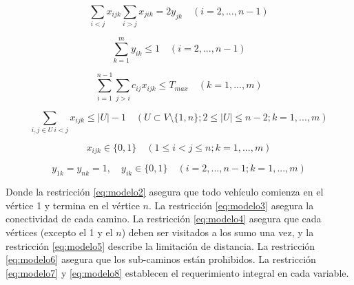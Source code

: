 \begin{equation} \label{eq:modelo3}
\sum_{i<j} x_{ijk} \sum_{i>j} x_{jik} = 2y_{jk} \quad (i =2,...,n-1)
\end{equation}

\begin{equation} \label{eq:modelo4}
\sum_{k=1}^{m} y_{ik} \leq 1 \quad (i =2,...,n-1)
\end{equation}

\begin{equation} \label{eq:modelo5}
\sum_{i=1}^{n-1} \sum_{j>i} c_{ij}x_{ijk} \leq T_{max} \quad (k=1,...,m)
\end{equation}

\begin{equation} \label{eq:modelo6}
\sum_{i,j\in U \ i<j} x_{ijk} \leq |U|-1 \quad (U \subset V \setminus \{1,n\} ; 2 \leq |U| \leq n-2; k=1,...,m)
\end{equation}

\begin{equation} \label{eq:modelo7}
x_{ijk} \in \{0,1\} \quad (1 \leq i < j \leq n; k=1,...,m)
\end{equation}

\begin{equation} \label{eq:modelo8}
y_{1k} = y_{nk} = 1, \quad y_{ik} \in \{0,1\} \quad (i = 2,...,n-1; k=1,...,m)
\end{equation}

Donde la restricción \ref{eq:modelo2} asegura que todo vehículo comienza en el vértice 1 y termina en el vértice $n$. La restricción \ref{eq:modelo3} asegura la conectividad de cada camino. La restricción \ref{eq:modelo4} asegura que cada vértices (excepto el 1 y el $n$) deben ser visitados a los sumo una vez, y la restricción \ref{eq:modelo5} describe la limitación de distancia. La restricción \ref{eq:modelo6} asegura que los sub-caminos están prohibidos. La restricción \ref{eq:modelo7} y \ref{eq:modelo8} establecen el requerimiento integral en cada variable.


